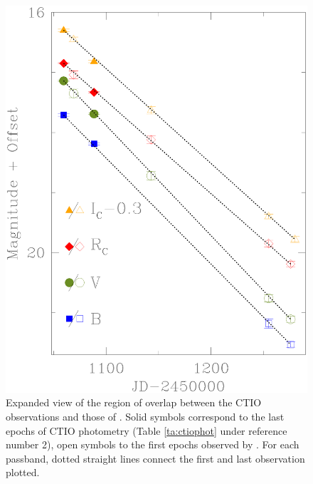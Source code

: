\documentclass[12pt,preprint]{aastex}
\begin{document}
\begin{figure}[t]
\includegraphics[angle=0,scale=0.7]{fig3.eps}
\caption{Expanded view of the region of overlap between the CTIO observations and those of \citet{soetal02}. Solid symbols
correspond to the last epochs of CTIO photometry (Table \ref{ta:ctiophot} under reference number 2), open symbols to the
first epochs observed by \citet{soetal02}. For each passband, dotted straight lines connect the first and last observation plotted.
\label{fi:join}}
\end{figure}

\clearpage
\end{document}
